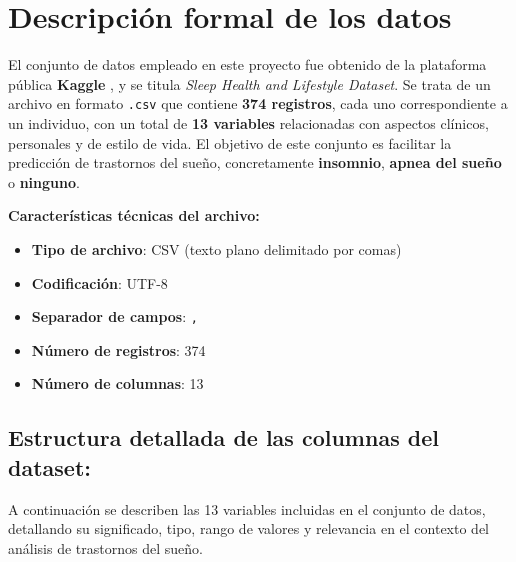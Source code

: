 

\section{Descripción formal de los datos}

El conjunto de datos empleado en este proyecto fue obtenido de la plataforma pública \textbf{Kaggle} \cite{alnour2024kaggle}, y se titula \textit{Sleep Health and Lifestyle Dataset}. Se trata de un archivo en formato \verb|.csv| que contiene \textbf{374 registros}, cada uno correspondiente a un individuo, con un total de \textbf{13 variables} relacionadas con aspectos clínicos, personales y de estilo de vida. El objetivo de este conjunto es facilitar la predicción de trastornos del sueño, concretamente \textbf{insomnio}, \textbf{apnea del sueño} o \textbf{ninguno}.

\textbf{Características técnicas del archivo:}
\begin{itemize}
    \item \textbf{Tipo de archivo}: CSV (texto plano delimitado por comas)
    \item \textbf{Codificación}: UTF-8
    \item \textbf{Separador de campos}: \verb|,|
    \item \textbf{Número de registros}: 374
    \item \textbf{Número de columnas}: 13
\end{itemize}
 
\subsection{Estructura detallada de las columnas del dataset:}
A continuación se describen las 13 variables incluidas en el conjunto de datos, detallando su significado, tipo, rango de valores y relevancia en el contexto del análisis de trastornos del sueño.

